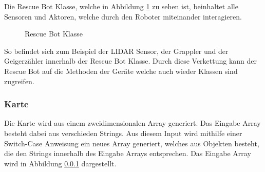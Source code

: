 Die Rescue Bot Klasse, welche in Abbildung \ref{bot2} zu sehen ist, beinhaltet alle Sensoren und Aktoren, welche durch den Roboter miteinander interagieren. 

\begin{figure}[H]
  \caption{Rescue Bot Klasse}
  \label{bot2}
\end{figure}
So befindet sich zum Beispiel der LIDAR Sensor, der Grappler und der Geigerzähler innerhalb der Rescue Bot Klasse. Durch diese Verkettung kann der Rescue Bot auf die Methoden der Geräte welche auch wieder Klassen sind zugreifen. 


\subsubsection{Karte}
\label{map}
Die Karte wird aus einem zweidimensionalen Array generiert. Das Eingabe Array besteht dabei aus verschieden Strings. Aus diesem Input wird mithilfe einer Switch-Case Anweisung ein neues Array generiert, welches aus Objekten besteht, die den Strings innerhalb des Eingabe Arrays entsprechen. Das Eingabe Array wird in Abbildung \ref{map} dargestellt. 

